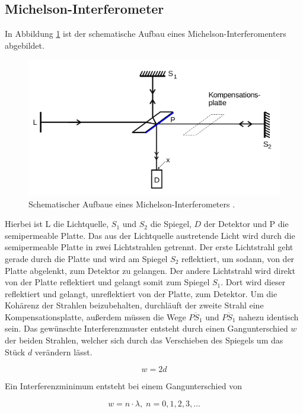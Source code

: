 \subsection{Michelson-Interferometer}
In Abbildung \ref{Abb:1} ist der schematische Aufbau eines Michelson-Interferomenters abgebildet.

\begin{figure}
  \centering
  \includegraphics[scale = 0.5]{V401-Bild1.png}
  \caption{Schematischer Aufbaue eines Michelson-Interferometers \cite{Q1}.}
  \label{Abb:1}
\end{figure}

Hierbei ist L die Lichtquelle, $S_1$ und $S_2$ die Spiegel, $D$
der Detektor und P die semipermeable Platte. Das aus der Lichtquelle austretende Licht wird durch die semipermeable Platte in zwei Lichtstrahlen getrennt.
Der erste Lichtstrahl geht gerade durch die Platte und wird am Spiegel $S_2$ reflektiert, um sodann, von der Platte  abgelenkt, zum Detektor zu gelangen. Der andere Lichtstrahl
wird direkt von der Platte reflektiert und gelangt somit zum Spiegel $S_1$. Dort wird dieser reflektiert und gelangt, unreflektiert von der Platte, zum Detektor. Um die
Kohärenz der Strahlen beizubehalten, durchläuft der zweite Strahl eine Kompensationsplatte, außerdem müssen die Wege $\overline{PS_1}$ und $\overline{PS_1}$ nahezu identisch sein.
Das gewünschte Interferenzmuster entsteht durch einen Gangunterschied $w$  der beiden Strahlen, welcher sich durch das Verschieben des Spiegels um das Stück $d$ verändern lässt.

\begin{equation}
  w = 2d
\end{equation}

Ein Interferenzminimum entsteht bei einem Gangunterschied von

\begin{equation*}
  w = n \cdot \lambda, \; n = 0, 1, 2, 3, ...
\end{equation*}

